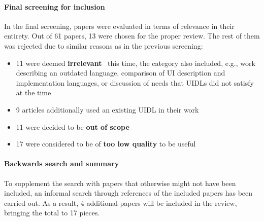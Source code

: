 \paragraph{Final screening for inclusion}

In the final screening, papers were evaluated in terms of relevance in their entirety.
Out of 61 papers, 13 were chosen for the proper review.
The rest of them was rejected due to similar reasons as in the previous screening:
\begin{itemize}
    \item 11 were deemed \textbf{irrelevant} \textendash\ this time, the category also included, e.g., work describing an outdated language, comparison of UI description and implementation languages, or discussion of needs that UIDLs did not satisfy at the time
    \item 9 articles additionally used an existing UIDL in their work
    \item 11 were decided to be \textbf{out of scope}
    \item 17 were considered to be of \textbf{too low quality} to be useful
\end{itemize}

\paragraph{Backwards search and summary}

To supplement the search with papers that otherwise might not have been included, an informal search through references of the included papers has been carried out.
As a result, 4 additional papers will be included in the review, bringing the total to 17 pieces.


